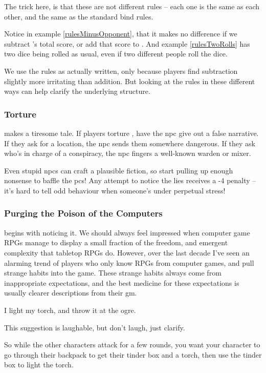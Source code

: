 \begin{multicols}{2}
The trick here, is that these are not different rules -- each one is the same as each other, and the same as the standard \gls{bind} rules.

Notice in example \ref{rulesMinusOpponent}, that it makes no difference if we subtract 's total score, or add that score to .
And example \ref{rulesTwoRolls} has two dice being rolled as usual, even if two different people roll the dice.

We use the rules as actually written, only because players find subtraction slightly more irritating than addition.
But looking at the rules in these different ways can help clarify the underlying structure.

\subsubsection{Torture}
makes a tiresome tale.
If players torture , have the \gls{npc} give out a false narrative.
If they ask for a location, the \gls{npc} sends them somewhere dangerous.
If they ask who's in charge of a conspiracy, the \gls{npc} fingers a well-known \gls{warden} or \gls{mixer}.

Even stupid \glspl{npc} can craft a plausible fiction, so start pulling up enough nonsense to baffle the \glspl{pc}!
Any attempt to notice the lies receives a -4 penalty -- it's hard to tell odd behaviour when someone's under perpetual stress!

\subsubsection{Purging the Poison of the Computers}
begins with noticing it.
We should always feel impressed when computer game RPGs manage to display a small fraction of the freedom, and emergent complexity that tabletop RPGs do.
However, over the last decade I've seen an alarming trend of players who only know RPGs from computer games, and pull strange habits into the game.
These strange habits always come from inappropriate expectations, and the best medicine for these expectations is usually clearer descriptions from their \gls{gm}.

\begin{boxtext}
  I light my torch, and throw it at the ogre.
\end{boxtext}

This suggestion is laughable, but don't laugh, just clarify.

\begin{speechtext}
  So while the other characters attack for a few rounds, you want your character to go through their backpack to get their tinder box and a torch, then use the tinder box to light the torch.


\end{speechtext}
\end{multicols}
